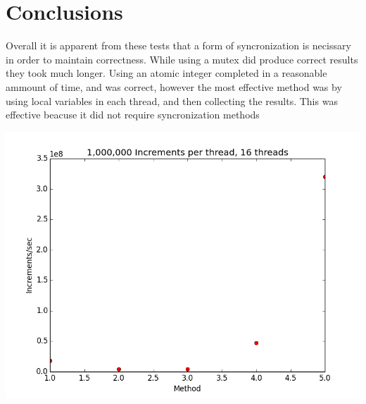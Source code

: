 \documentclass[12pt]{article}
\begin{document}
\section{Conclusions}\label{conclusions}
Overall it is apparent from these tests that a form of syncronization is necissary
in order to maintain correctness. While using a mutex did produce correct results
they took much longer. Using an atomic integer completed in a reasonable ammount of
time, and was correct, however the most effective method was by using local variables
in each thread, and then collecting the results. This was effective beacuse it did not
require syncronization methods

\includegraphics[scale=.5]{Graphs/MethodCmp.png}
\end{document}
